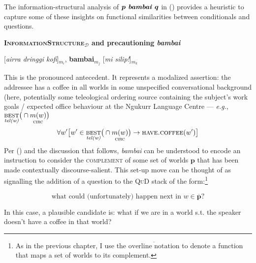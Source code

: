 The information-structural analysis of $ \boldsymbol{p \textit{ \textbf{bambai }}q} $ in () provides a heuristic to capture some of these insights on functional similarities between conditionals and questions.


\pex[labelformat=$\boldsymbol m_A$,pexcnt=105]  \textbf{\textsc{InformationStructure}$ _\mathcal D $ and precautioning \emph{bambai}}

[\textit{airra dringgi kofi}]$_{m_i}$, \textbf{bambai}$ _{m_j} $ [\textit{mi silip!}]$_{m_k}$


	\a This is the pronounced antecedent. It represents a modalized assertion: the addressee has a coffee in all worlds in some unspecified conversational background (here, potentially some teleological ordering source containing the subject's work goals / expected office behaviour at the Ngukurr Language Centre --- \textit{e.g.}, $ \underset{\textit{tel(w)}}{\textsc{best}}\big(\cap\underset{\textsc{circ}}{m(w)}\big)  $
	$$\forall w'\big[w'\in\underset{\textit{tel(w)}}{\textsc{best}}\big(\cap\underset{\textsc{circ}}{m(w)}\big) \to \textsc{have.coffee}(w')\big]$$
	\a {} Per () and the discussion that follows, \textit{bambai} can be understood to encode an instruction to consider the \textsc{complement} of some set of worlds $ \boldsymbol p $ that has been made contextually discourse-salient. This set-up move can be thought of as signalling the addition of a question to the \textsc{QuD} stack of the form:\footnote{As in the previous chapter, I use the $ \overline{\text{overline notation}} $ to denote a function that maps a set of worlds to its complement.}
	
	 $$\text{what could (unfortunately) happen next in } w\in\overline{\boldsymbol p}\text{?}$$
	
	 In this case, a plausible candidate is: what if we are in a world s.t. the speaker doesn't have a coffee in that world? 
	

